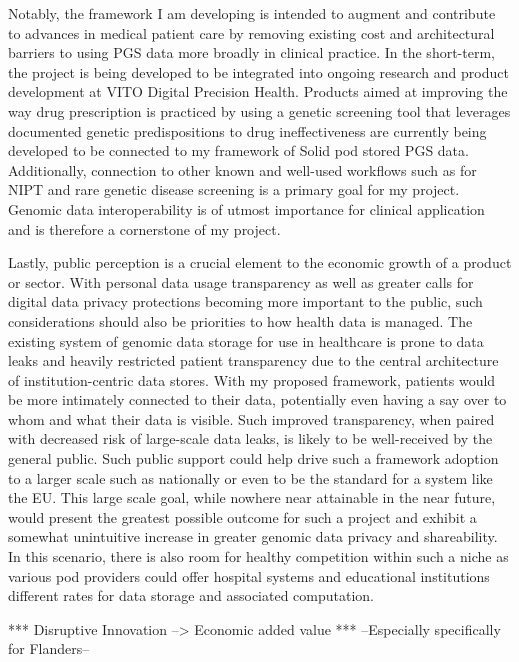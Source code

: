 \documentclass[11pt]{article}
\begin{document}
Notably, the framework I am developing is intended to augment and contribute to advances in medical patient care by removing existing cost and architectural barriers to using PGS data more broadly in clinical practice. 
In the short-term, the project is being developed to be integrated into ongoing research and product development at VITO Digital Precision Health. 
Products aimed at improving the way drug prescription is practiced by using a genetic screening tool that leverages documented genetic predispositions to drug ineffectiveness are currently being developed to be connected to my framework of Solid pod stored PGS data. 
Additionally, connection to other known and well-used workflows such as for NIPT and rare genetic disease screening is a primary goal for my project. 
Genomic data interoperability is of utmost importance for clinical application and is therefore a cornerstone of my project. 

Lastly, public perception is a crucial element to the economic growth of a product or sector. With personal data usage transparency as well as greater calls for digital data privacy protections becoming more important to the public, such considerations should also be priorities to how health data is managed. 
The existing system of genomic data storage for use in healthcare is prone to data leaks and heavily restricted patient transparency due to the central architecture of institution-centric data stores. 
With my proposed framework, patients would be more intimately connected to their data, potentially even having a say over to whom and what their data is visible. 
Such improved transparency, when paired with decreased risk of large-scale data leaks, is likely to be well-received by the general public. 
Such public support could help drive such a framework adoption to a larger scale such as nationally or even to be the standard for a system like the EU. 
This large scale goal, while nowhere near attainable in the near future, would present the greatest possible outcome for such a project and exhibit a somewhat unintuitive increase in greater genomic data privacy and shareability. 
In this scenario, there is also room for healthy competition within such a niche as various pod providers could offer hospital systems and educational institutions different rates for data storage and associated computation.

*** Disruptive Innovation --> Economic added value ***
	--Especially specifically for Flanders–


\end{document}
